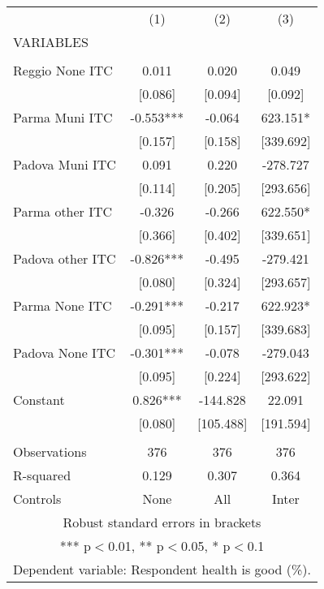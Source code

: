 \begin{tabular}{lccc} \hline
 & (1) & (2) & (3) \\
VARIABLES &  &  &  \\ \hline
 &  &  &  \\
Reggio None ITC & 0.011 & 0.020 & 0.049 \\
 & [0.086] & [0.094] & [0.092] \\
Parma Muni ITC & -0.553*** & -0.064 & 623.151* \\
 & [0.157] & [0.158] & [339.692] \\
Padova Muni ITC & 0.091 & 0.220 & -278.727 \\
 & [0.114] & [0.205] & [293.656] \\
Parma other ITC & -0.326 & -0.266 & 622.550* \\
 & [0.366] & [0.402] & [339.651] \\
Padova other ITC & -0.826*** & -0.495 & -279.421 \\
 & [0.080] & [0.324] & [293.657] \\
Parma None ITC & -0.291*** & -0.217 & 622.923* \\
 & [0.095] & [0.157] & [339.683] \\
Padova None ITC & -0.301*** & -0.078 & -279.043 \\
 & [0.095] & [0.224] & [293.622] \\
Constant & 0.826*** & -144.828 & 22.091 \\
 & [0.080] & [105.488] & [191.594] \\
 &  &  &  \\
Observations & 376 & 376 & 376 \\
R-squared & 0.129 & 0.307 & 0.364 \\
 Controls & None & All & Inter \\ \hline
\multicolumn{4}{c}{ Robust standard errors in brackets} \\
\multicolumn{4}{c}{ *** p$<$0.01, ** p$<$0.05, * p$<$0.1} \\
\multicolumn{4}{c}{ Dependent variable: Respondent health is good (\%).} \\
\end{tabular}
